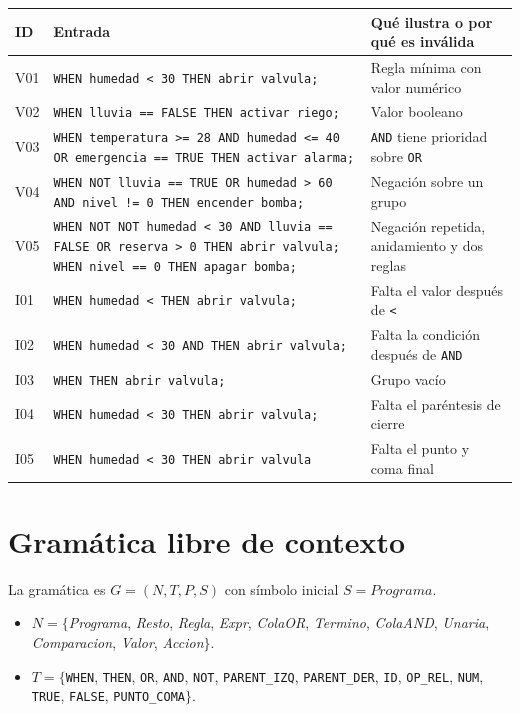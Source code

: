 \documentclass[11pt,a4paper]{article}
\newcommand{\tk}[1]{\texttt{#1}}
\newcommand{\nt}[1]{\textit{#1}}
\begin{document}
\begin{xltabular}{\textwidth}{l Y{1.2} Y{0.8}}
  \toprule
  \textbf{ID} & \textbf{Entrada}
  & \textbf{Qué ilustra o por qué es inválida} \\
  \midrule
  \endhead
  V01         & \tk{WHEN humedad < 30 THEN abrir valvula;}
  & Regla mínima con valor numérico            \\
  V02         & \tk{WHEN lluvia == FALSE THEN activar riego;}
  & Valor booleano                             \\
  V03         & \tk{WHEN temperatura >= 28 AND humedad <= 40 OR
  emergencia == TRUE THEN activar alarma;}
  & \tk{AND} tiene prioridad sobre \tk{OR}     \\
  V04         & \tk{WHEN NOT lluvia == TRUE OR humedad >
    60\char41{} AND
  nivel != 0 THEN encender bomba;}
  & Negación sobre un grupo                    \\
  V05         & \tk{WHEN NOT NOT humedad < 30 AND
    \char40{}lluvia == FALSE
    OR reserva > 0\char41{}\char41{} THEN abrir valvula; WHEN nivel
    == 0 THEN apagar
  bomba;}                                          & Negación
  repetida, anidamiento y dos reglas \\
  \midrule
  I01         & \tk{WHEN humedad < THEN abrir valvula;}
  & Falta el valor después de \tk{<}           \\
  I02         & \tk{WHEN humedad < 30 AND THEN abrir valvula;}
  & Falta la condición después de \tk{AND}     \\
  I03         & \tk{WHEN  THEN abrir valvula;}
  & Grupo vacío                                \\
  I04         & \tk{WHEN humedad < 30 THEN abrir valvula;}
  & Falta el paréntesis de cierre              \\
  I05         & \tk{WHEN humedad < 30 THEN abrir valvula}
  & Falta el punto y coma final                \\
  \bottomrule
\end{xltabular}

\section{Gramática libre de contexto}
\label{sec:glc}

La gramática es $G = (N, T, P, S)$ con símbolo inicial $S = \nt{Programa}$.

\begin{itemize}
  \item $N = \{$\nt{Programa}, \nt{Resto}, \nt{Regla}, \nt{Expr},
      \nt{ColaOR}, \nt{Termino}, \nt{ColaAND}, \nt{Unaria},
    \nt{Comparacion}, \nt{Valor}, \nt{Accion}$\}$.
  \item $T = \{$\tk{WHEN}, \tk{THEN}, \tk{OR}, \tk{AND}, \tk{NOT},
      \tk{PARENT\_IZQ}, \tk{PARENT\_DER}, \tk{ID}, \tk{OP\_REL},
    \tk{NUM}, \tk{TRUE}, \tk{FALSE}, \tk{PUNTO\_COMA}$\}$.
\end{itemize}
\end{document}
